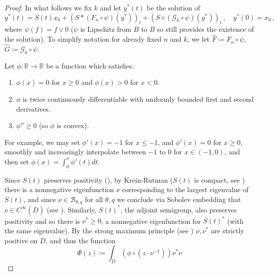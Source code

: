 \documentclass[final]{amsart}
\numberwithin{thm}{section}
\numberwithin{equation}{section}
\newcommand{\R}{\mathbb{R}}
\newcommand{\B}{\mathcal{B}}
\begin{document}
\begin{proof}
    In what follows we fix $k$ and
    let $y^*(t)$ be the solution of
    \begin{equation}\label{eq:truncated-positive}
            y^*(t) = S(t) x_0 + (S * (F_n \circ \psi)(y^*))_t + (S \diamond (\mathcal{G}_k \circ \psi)(y^*))_t\,, \quad y^*(0) = x_0 \,,
    \end{equation}
    where $\psi(f) = f \vee 0$ ($\psi$ is Lipschitz from $B$ to $B$ so  still provides the existence of the solution). To simplify notation for already fixed $n$ and $k$, we let $\hat F \coloneqq F_n \circ \psi$, $\hat G \coloneqq \mathcal{G}_k \circ \psi$.
    
    
    
    
    
    
    
    
    
   
    
    
    
    
    
    Let $\phi: \R \to \R$ be a function which satisfies:
    \begin{enumerate}[label=(\roman*)]
        \item $\phi(x) = 0$ for $x \geq 0$ and $\phi(x) > 0$ for $x < 0$.
        \item $\phi$ is twice continuously differentiable with uniformly bounded first and second derivatives.
        \item $\phi'' \geq 0$ (so $\phi$ is convex).
    \end{enumerate}
    For example, we may set $\phi'(x) = -1$ for $x \leq -1$, and 
    $\phi'(x) = 0$ for $x \geq 0$, smoothly and increasingly interpolate between $-1$ to $0$ for $x \in (-1,0)$, and then set $\phi(x) = \int_0^x\phi'(t)dt$.

    
    
    Since $S(t)$ preserves positivity (), by Krein-Rutman ($S(t)$ is compact, see ) there is a nonnegative eigenfunction $\nu$ corresponding to the largest eigenvalue of $S(t)$, and since $\nu \in \B_{\theta,q}$ for all $\theta,q$ we conclude via Sobolev embedding that $\nu \in C^\infty(\overline D)$ (see ).  Similarly, $S(t)^*$, the adjoint semigroup, also preserves positivity and so there is $\nu^* \geq 0$, a nonnegative eigenfunction for $S(t)^*$ (with the same eigenvalue). By the strong maximum principle (see ) $\nu, \nu^*$ are strictly positive on $D$, and thus the function
    $$\Phi(z) \coloneqq \int_D (\phi \circ (z\cdot\nu^{-1}))\nu^*\nu$$
    

\end{proof}
\end{document}
